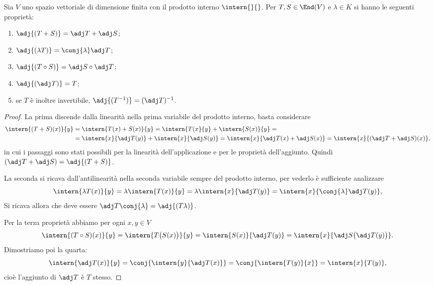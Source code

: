 \begin{proprieta} \label{p:proprieta-aggiunto}
	Sia $V$ uno spazio vettoriale di dimensione finita con il prodotto interno $\intern{}{}$.
	Per $T,S\in\End(V)$ e $\lambda\in K$ si hanno le seguenti proprietà:
	\begin{enumerate}
		\item $\adj{(T+S)}=\adj T+\adj S$;
		\item $\adj{(\lambda T)}=\conj{\lambda}\adj T$;
		\item $\adj{(T\circ S)}=\adj S\circ\adj T$;
		\item $\adj{(\adj T)}=T$;
		\item se $T$ è inoltre invertibile, $\adj{(T^{-1})}=(\adj T)^{-1}$.
	\end{enumerate}
\end{proprieta}
\begin{proof}
	La prima discende dalla linearità nella prima variabile del prodotto interno, basta considerare
	\[\begin{split}
		\intern{(T+S)(  x)}{  y} &= \intern{T(  x)+S(  x)}{  y} = \intern{T(  x}{  y} + \intern{S(  x)}{  y} =\\ &= \intern{  x}{\adj T(  y)} + \intern{  x}{\adj S(  y)} = \intern{  x}{\adj T(  x) + \adj S(  x)} = \intern{  x}{(\adj T + \adj S)(  x)},
	\end{split}\]
	in cui i passaggi sono stati possibili per la  linearità dell'applicazione e per le proprietà dell'aggiunto.
	Quindi $(\adj T + \adj S) = \adj{(T + S)}$.
	
	La seconda si ricava dall'antilinearità nella seconda variabile sempre del prodotto interno, per vederlo è sufficiente analizzare
	\[
		\intern{\lambda T(  x)}{  y} = \lambda \intern{T(  x)}{  y} = \lambda \intern{  x }{\adj T(  y)} = \intern{  x}{ \conj{\lambda}\adj T(  y)},
	\]
	Si ricava allora che deve essere $\adj T \conj{\lambda} = \adj{( T \lambda)}$.
	
	Per la terza proprietà abbiamo per ogni $  x,  y\in V$
	\begin{equation}
		\intern{(T\circ S)(  x)}{  y}=\intern{T\big(S(  x)\big)}{  y}=\intern{S(  x)}{\adj T(  y)}=\intern{  x}{\adj S\big(\adj T(  y)\big)}.
	\end{equation}
	Dimostriamo poi la quarta:
	\begin{equation}
		\intern{\adj T(  x)}{  y}=\conj{\intern{  y}{\adj T(  x)}}=\conj{\intern{T(  y)}{  x}}=\intern{  x}{T(  y)},
	\end{equation}
	cioè l'aggiunto di $\adj T$ è $T$ stesso.
\end{proof}

